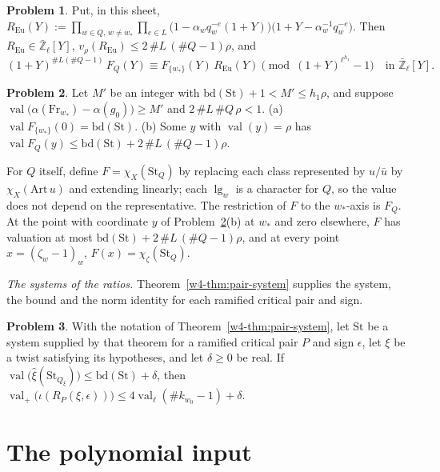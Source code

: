 \documentclass[reqno]{amsart}
\theoremstyle{definition}
\newtheorem{problem}{Problem}[section]
\theoremstyle{plain}
\newcommand{\Zl}{\bar{\mathbb{Z}}_\ell}
\newcommand{\val}{\operatorname{val}}
\newcommand{\St}{\mathrm{St}}
\newcommand{\bd}{\mathrm{bd}}
\newcommand{\Fr}{\mathrm{Fr}}
\begin{document}
\begin{problem}\label{pr:system-congruence}
Put, in this sheet, \(R_{\mathrm{Eu}}(Y) := \prod_{w \in Q,\, w \ne w_*} \prod_{e \in L} \bigl(1 - \alpha_w q_w^{-e}(1 + Y)\bigr)\bigl(1 + Y - \alpha_w^{-1} q_w^{-e}\bigr)\).  Then \(R_{\mathrm{Eu}} \in \Zl[Y]\), \(v_\rho(R_{\mathrm{Eu}}) \le 2\,\#L\,(\#Q - 1)\rho\), and
\[
  (1 + Y)^{\#L(\#Q - 1)}\, F_Q(Y) \equiv F_{\{w_*\}}(Y)\, R_{\mathrm{Eu}}(Y) \pmod{(1 + Y)^{\ell^{h_1}} - 1} \quad\text{in } \Zl[Y].
\]
\end{problem}

\begin{problem}\label{pr:system-line}
Let \(M'\) be an integer with \(\bd(\St) + 1 < M' \le h_1\rho\), and suppose \(\val\bigl(\alpha(\Fr_{w_*}) - \alpha(g_0)\bigr) \ge M'\) and \(2\,\#L\,\#Q\,\rho < 1\).
\textup{(a)} \(\val F_{\{w_*\}}(0) = \bd(\St)\).
\textup{(b)} Some \(y\) with \(\val(y) = \rho\) has \(\val F_Q(y) \le \bd(\St) + 2\,\#L\,(\#Q - 1)\rho\).
\end{problem}

For \(Q\) itself, define \(F = \chi_X(\St_Q)\) by replacing each class represented by \(u/\bar u\) by \(\chi_X(\mathrm{Art}\,u)\) and extending linearly; each \(\lg_w\) is a character for \(Q\), so the value does not depend on the representative.  The restriction of \(F\) to the \(w_*\)-axis is \(F_Q\).  At the point with coordinate \(y\) of Problem~\ref{pr:system-line}(b) at \(w_*\) and zero elsewhere, \(F\) has valuation at most \(\bd(\St) + 2\,\#L\,(\#Q - 1)\rho\), and at every point \(x = (\zeta_w - 1)_w\), \(F(x) = \chi_\zeta(\St_Q)\).

\emph{The systems of the ratios.}  Theorem~\ref{w4-thm:pair-system} supplies the system, the bound and the norm identity for each ramified critical pair and sign.

\begin{problem}\label{pr:ratio-from-system}
With the notation of Theorem~\ref{w4-thm:pair-system}, let \(\St\) be a system supplied by that theorem for a ramified critical pair \(P\) and sign \(\epsilon\), let \(\xi\) be a twist satisfying its hypotheses, and let \(\delta \ge 0\) be real.  If \(\val\bigl(\hat\xi(\St_{Q_\xi})\bigr) \le \bd(\St) + \delta\), then \(\val_+\bigl(\iota(R_P(\xi, \epsilon))\bigr) \le 4\val_\ell(\#k_{w_0} - 1) + \delta\).
\end{problem}

\section{The polynomial input}\label{sec:input}
\end{document}
